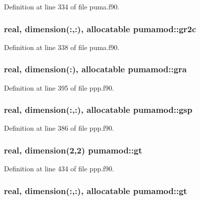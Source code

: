 \-Definition at line 334 of file puma.\-f90.

\hypertarget{classpumamod_a0063c8f28d68f19195b2154874bb4605}{
\subsubsection[{gr2c}]{\setlength{\rightskip}{0pt plus 5cm}real, dimension(\-:,\-:), allocatable {\bf pumamod\-::gr2c}}}
\label{classpumamod_a0063c8f28d68f19195b2154874bb4605}


\-Definition at line 338 of file puma.\-f90.

\hypertarget{classpumamod_a5cb12da2095a04506c22df1b670575f6}{
\subsubsection[{gra}]{\setlength{\rightskip}{0pt plus 5cm}real, dimension(\-:), allocatable {\bf pumamod\-::gra}}}
\label{classpumamod_a5cb12da2095a04506c22df1b670575f6}


\-Definition at line 395 of file ppp.\-f90.

\hypertarget{classpumamod_aade6f1ed946b27ba82c9ec0249699994}{
\subsubsection[{gsp}]{\setlength{\rightskip}{0pt plus 5cm}real, dimension(\-:,\-:), allocatable {\bf pumamod\-::gsp}}}
\label{classpumamod_aade6f1ed946b27ba82c9ec0249699994}


\-Definition at line 386 of file ppp.\-f90.

\hypertarget{classpumamod_a19345ffa11bc96c6b5a16f205d54d59c}{
\subsubsection[{gt}]{\setlength{\rightskip}{0pt plus 5cm}real, dimension(2,2) {\bf pumamod\-::gt}}}
\label{classpumamod_a19345ffa11bc96c6b5a16f205d54d59c}


\-Definition at line 434 of file ppp.\-f90.

\hypertarget{classpumamod_a3001f3699640a16cd7f91c6aa528af16}{
\subsubsection[{gt}]{\setlength{\rightskip}{0pt plus 5cm}real, dimension(\-:,\-:), allocatable {\bf pumamod\-::gt}}}
\label{classpumamod_a3001f3699640a16cd7f91c6aa528af16}


